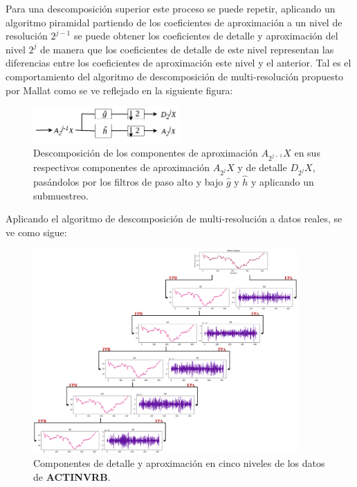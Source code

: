 Para una descomposición superior este proceso se puede repetir, aplicando un algoritmo piramidal partiendo de los coeficientes de aproximación a un nivel de resolución $2^{j-1}$ se puede obtener los coeficientes de detalle y aproximación del nivel $2^{j}$ de manera que los coeficientes de detalle de este nivel representan las diferencias entre los coeficientes de aproximación este nivel y el anterior. Tal es el comportamiento del algoritmo de descomposición de multi-resolución propuesto por Mallat \cite{mulresolution_sigmal_desc_DWT_Mallat} como se ve reflejado en la siguiente figura:


\begin{figure}[H]
    \centering
    \includegraphics[width=0.5\textwidth]{Figuras/descomposicion/multiresolution_analisis_DWT.png}
    \caption{Descomposición de los componentes de aproximación $A_{2^{j-1}}X$ en sus respectivos componentes de aproximación $A_{2^{j}}X$ y de detalle $D_{2^{j}}X$, pasándolos por los filtros de paso alto y bajo $\hat{g}$ y $\hat{h}$ y aplicando un submuestreo.}
    \label{fig:algoritmo_por_subbandas}
\end{figure}

Aplicando el algoritmo de descomposición de multi-resolución a datos reales, se ve como sigue:

\begin{figure}[H]
    \centering
    \includegraphics[width=0.9\textwidth]{Figuras/construccion_del_modelo/ACTINVRB_DWT_lvl1_5.png}
    \caption{Componentes de detalle y aproximación en cinco niveles de los datos de \textbf{ACTINVRB}.} 
    \label{fig:ACTINVRB_DWT_nivel1_5}
\end{figure}

